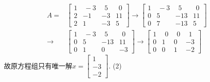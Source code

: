 \begin{displaymath}
\begin{aligned}
A=&\begin{bmatrix} 1&\ -3&\ \ 5&\ \ 0\\2&-1&-3&11\\2&1&-3&5 \end{bmatrix}\rightarrow
\begin{bmatrix}1&\ -3&\ \ 5&\ \ 0\\0&5&-13&11\\0&7&-13&5  \end{bmatrix}\\ \rightarrow&
\begin{bmatrix}1&\ -3&\ \ 5&\ \ 0\\0&5&-13&11\\0&1&0&-3  \end{bmatrix} \rightarrow
\begin{bmatrix} 1&\ \ 0&\ \ 0&\ \ 1\\0&1&0&-3\\0&0&1&-2 \end{bmatrix}
\end{aligned} \end{displaymath}
故原方程组只有唯一解$x=\begin{bmatrix}1\\-3\\-2\end{bmatrix}$.
(2)

